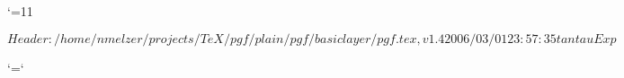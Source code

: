 %

\edef\pgfatcode{\the\catcode`\@}
\catcode`\@=11



\ProvidesPackageRCS $Header: /home/nmelzer/projects/TeX/pgf/plain/pgf/basiclayer/pgf.tex,v 1.4 2006/03/01 23:57:35 tantau Exp $









\catcode`\@=\pgfatcode

\endinput
